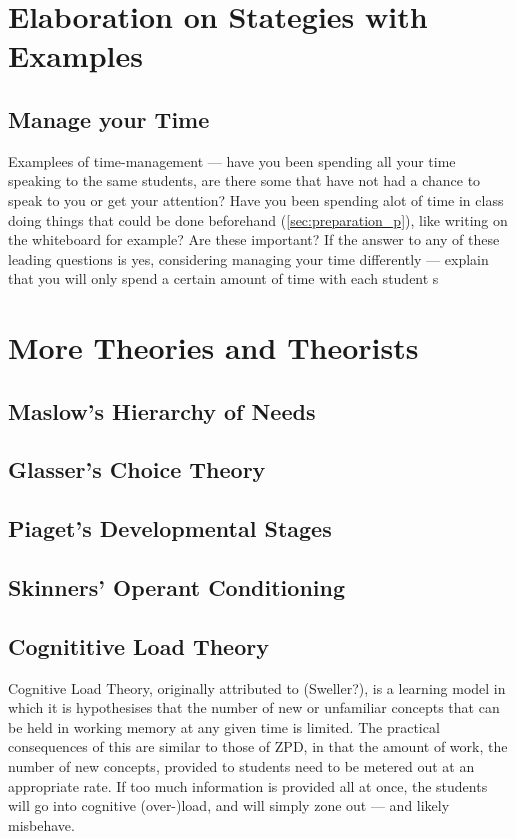 \documentclass[12pt]{report}
\begin{document}
\begin{appendices}

\chapter{Elaboration on Stategies with Examples}

\section{Manage your Time}
Examplees of time-management --- have you been spending all your time speaking to the same students, are there some that have not had a chance to speak to you or get your attention? Have you been spending alot of time in class doing things that could be done beforehand (\ref{sec:preparation_p}), like writing on the whiteboard for example? Are these important? If the answer to any of these leading questions is yes, considering managing your time differently --- explain that you will only spend a certain amount of time with each student s


\chapter{More Theories and Theorists}


\section{Maslow's Hierarchy of Needs}


\section{Glasser's Choice Theory}


\section{Piaget's Developmental Stages}



\section{Skinners' Operant Conditioning}

\section{Cognititive Load Theory}

Cognitive Load Theory, originally attributed to (Sweller?), is a learning model in which it is hypothesises that the number of new or unfamiliar concepts that can be held in working memory at any given time is limited. The practical consequences of this are similar to those of ZPD, in that the amount of work, the number of new concepts, provided to students need to be metered out at an appropriate rate. If too much information is provided all at once, the students will go into cognitive (over-)load, and will simply zone out --- and likely misbehave.


\end{appendices}

{}

\end{document}
